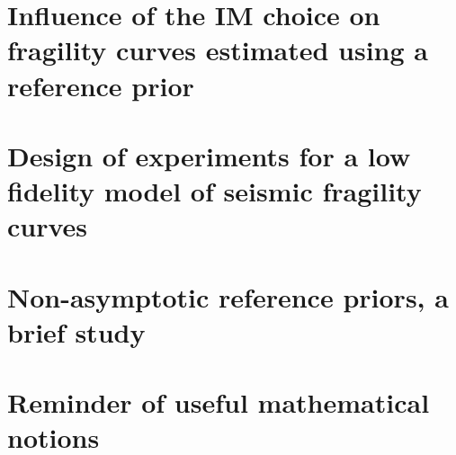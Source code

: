 \documentclass[a4paper]{book}
\begin{document}

\chapter{Influence of the IM choice on fragility curves estimated using a reference prior}\label{app:chap:uncecomp}



\chapter{Design of experiments for a low fidelity model of seismic fragility curves}\label{app:chap:ESAIM}




\chapter{Non-asymptotic reference priors, a brief study}




\chapter{Reminder of useful mathematical notions}

 
 

\printbibliography[heading=chapter,title=Bibliography]
\end{document}
